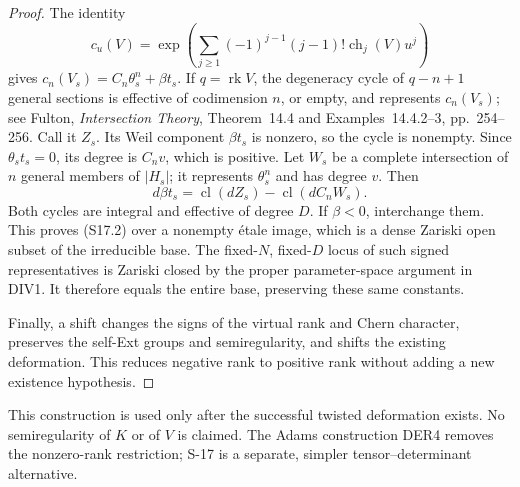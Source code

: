 \documentclass[11pt,a4paper]{article}
\theoremstyle{definition}
\begin{document}
\begin{proof}
The identity
\[
 c_u(V)=\exp\!\left(\sum_{j\ge1}
             (-1)^{j-1}(j-1)!\operatorname{ch}_j(V)u^j\right)
\]
gives $c_n(V_s)=C_n\theta_s^n+\beta t_s$.
If $q=\operatorname{rk}V$, the degeneracy cycle of $q-n+1$
general sections is effective of codimension $n$, or empty,
and represents $c_n(V_s)$; see Fulton, \emph{Intersection
Theory}, Theorem~14.4 and Examples~14.4.2--3, pp.~254--256.
Call it $Z_s$. Its Weil component $\beta t_s$ is nonzero,
so the cycle is nonempty. Since $\theta_st_s=0$, its degree is
$C_nv$, which is positive. Let $W_s$ be a complete intersection
of $n$ general members of $|H_s|$; it represents $\theta_s^n$
and has degree $v$. Then
\[
 d\beta t_s=\operatorname{cl}(dZ_s)
                   -\operatorname{cl}(dC_nW_s).
\]
Both cycles are integral and effective of degree $D$.
If $\beta<0$, interchange them. This proves (S17.2) over a
nonempty \'etale image, which is a dense Zariski open subset
of the irreducible base. The fixed-$N$, fixed-$D$ locus of such
signed representatives is Zariski closed by the proper
parameter-space argument in DIV1. It therefore equals the
entire base, preserving these same constants.

Finally, a shift changes the signs of the virtual rank and
Chern character, preserves the self-Ext groups and
semiregularity, and shifts the existing deformation.
This reduces negative rank to positive rank without adding
a new existence hypothesis.
\end{proof}

This construction is used only after the successful twisted
deformation exists. No semiregularity of $K$ or of $V$ is claimed.
The Adams construction DER4 removes the nonzero-rank restriction;
S-17 is a separate, simpler tensor--determinant alternative.
\end{document}
